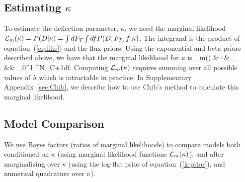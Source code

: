 \subsection{Estimating $\kappa$}

To estimate the deflection parameter, $\kappa$, we need the marginal
likelihood ${\cal L}_m(\kappa) = P(D|\kappa) = \int dF_T\int df
P(D,F_T,f|\kappa)$.  The integrand is the product of equation~(\ref{eq:like})
and the flux priors.  Using the exponential and beta priors described above,
we have that the marginal likelihood for $\kappa$ is
\ba
\like_m(\kappa)
  &=& \sum_\lambda {}\nonumber\\
  &&  \times\int_0^1
           {^{N_C+1}}df.
\label{eq:marg}
\ea
Computing ${\cal L}_m(\kappa)$ requires summing over all possible values of
$\lambda$ which is intractable in practice.  In Supplementary
Appendix~\ref{sec:Chib}, we describe how to use Chib's method
\cite{MR1379473} to calculate this marginal likelihood.

\subsection{Model Comparison}


We use Bayes factors (ratios of marginal likelihoods) to compare models both
conditioned on $\kappa$ (using marginal likelihood functions
${\cal L}_m(\kappa)$), and after marginalizing over $\kappa$ (using the log-flat
prior of equation~(\ref{k-prior}), and numerical quadrature over
$\kappa$).

